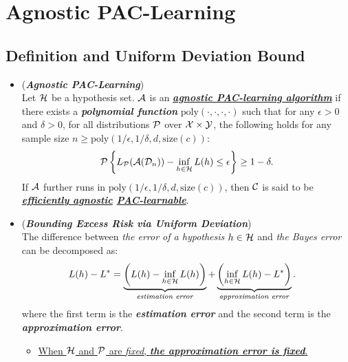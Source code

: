 \documentclass[11pt]{article}
\begin{document}
\section{Agnostic PAC-Learning}
\subsection{Definition and Uniform Deviation Bound}
\begin{itemize}
\item \begin{definition} (\emph{\textbf{Agnostic PAC-Learning}})\\
Let ${\mathcal H}$ be a hypothesis set. ${\mathcal A}$ is an \underline{\emph{\textbf{agnostic PAC-learning algorithm}}} if there
exists a \emph{\textbf{polynomial function}} $\text{poly}(\cdot, \cdot, \cdot, \cdot)$  such that for any $\epsilon > 0$ and $\delta > 0$,
for all distributions ${\mathcal P}$ over ${\mathcal X} \times {\mathcal Y}$, the following holds for any sample size $n \ge \text{poly}(1/\epsilon, 1/\delta, d, \text{size}(c))$:
\begin{align}
{\mathcal P}\left\{L_{{\mathcal P}}({\mathcal A}({\mathcal D}_n)) - \inf_{h \in {\mathcal H}}L(h)  \le \epsilon \right\} \ge 1 - \delta. \label{eqn: agnostic_pac_definition}
\end{align} If ${\mathcal A}$ further runs in $\text{poly}(1/\epsilon, 1/\delta, d, \text{size}(c))$, then ${\mathcal C}$ is said to be \emph{\textbf{\underline{efficiently agnostic} \underline{PAC-learnable}}}. 
\end{definition}


\item \begin{remark} (\emph{\textbf{Bounding Excess Risk via Uniform Deviation}})\\
The difference between \emph{the error of a hypothesis} $h \in {\mathcal H}$ and \emph{the Bayes error} can be decomposed as:
\begin{align*}
L(h) - L^{*} &=\underbrace{\left(L(h) - \inf_{h \in {\mathcal H}}L(h)\right)}_{\text{\emph{estimation error}}} + \underbrace{\left(\inf_{h \in {\mathcal H}}L(h) - L^{*}\right)}_{\text{\emph{approximation error}}}.
\end{align*} 
where the first term is the \emph{\textbf{estimation error}} and the second term is the \emph{\textbf{approximation error}}.
\begin{itemize}
\item  \underline{When ${\mathcal H}$ and ${\mathcal P}$ are \emph{fixed}, \emph{\textbf{the approximation error is fixed}}.} 


\end{itemize}
\end{remark}
\end{itemize}
\end{document}
